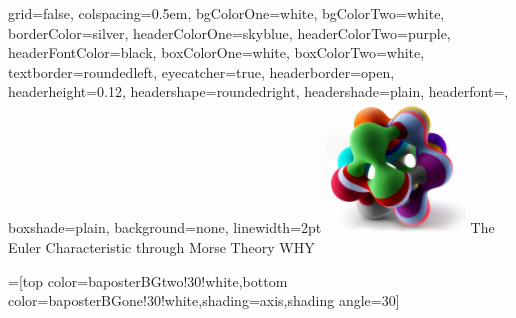 \documentclass[landscape,a0paper]{baposter}
\begin{document}
\newlength{\leftimgwidth}
\begin{poster}%
  {
  grid=false,
  colspacing=0.5em,
  bgColorOne=white,
  bgColorTwo=white,
  borderColor=silver,
  headerColorOne=skyblue,
  headerColorTwo=purple,
  headerFontColor=black,
 boxColorOne=white,
 boxColorTwo=white,
  textborder=roundedleft,
  eyecatcher=true,
  headerborder=open,
  headerheight=0.12\textheight,
  headershape=roundedright,
  headershade=plain,
  headerfont=\large\textsf, %
  boxshade=plain,
  background=none,
  linewidth=2pt
  }
  {\includegraphics[width=10em]{1234.png}} %
  {\sf %
    {\HUGE The Euler Characteristic through Morse Theory}}
  {\sf %
  \vspace{1em} 
  \LARGE{WHY}\\
  }
  { %
  }

  =[top color=baposterBGtwo!30!white,bottom color=baposterBGone!30!white,shading=axis,shading angle=30]

     \setlength{\leftimgwidth}{0.78em+8.0em}


\end{poster}
\end{document}
